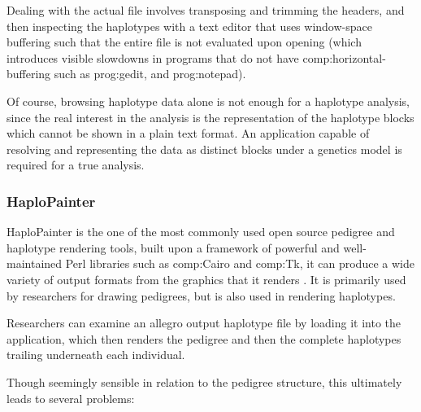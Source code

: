 Dealing with the actual file involves transposing and trimming the headers, and then inspecting the haplotypes with a text editor that uses window-space buffering such that the entire file is not evaluated upon opening (which introduces visible slowdowns in programs that do not have \gls{comp:horizontal-buffering} such as \gls{prog:gedit}, and \gls{prog:notepad}).

Of course, browsing haplotype data alone is not enough for a haplotype analysis, since the real interest in the analysis is the representation of the haplotype blocks which cannot be shown in a plain text format. An application capable of resolving and representing the data as distinct blocks under a genetics model is required for a true analysis.


\subsubsection{HaploPainter}

HaploPainter is the one of the most commonly used open source pedigree and haplotype rendering tools, built upon a framework of powerful and well-maintained Perl libraries such as \gls{comp:Cairo} and \gls{comp:Tk}, it can produce a wide variety of output formats from the graphics that it renders \cite{haplopainter}. It is primarily used by researchers for drawing pedigrees, but is also used in rendering haplotypes.

Researchers can examine an allegro output haplotype file by loading it into the application, which then renders the pedigree and then the complete haplotypes trailing underneath each individual.

Though seemingly sensible in relation to the pedigree structure, this ultimately leads to several problems:


